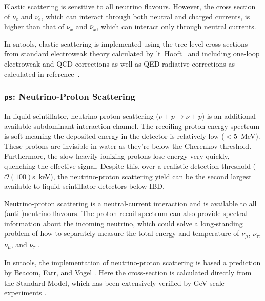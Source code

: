 \documentclass[11pt, oneside]{article}
\newcommand{\nue}{\ensuremath{\nu_e}\xspace}
\newcommand{\nux}{\ensuremath{\nu_x}\xspace}
\newcommand{\nuebar}{\ensuremath{\bar{\nu}_e}\xspace}
\newcommand{\nuxbar}{\ensuremath{\bar{\nu}_x}\xspace}
\begin{document}
Elastic scattering is sensitive to all neutrino flavours.
However, the cross section of \nue and \nuebar, which can interact through both neutral and charged currents, is higher than that of \nux and \nuxbar, which can interact only through neutral currents.

In sntools, elastic scattering is implemented using the tree-level cross sections from standard electroweak theory calculated by ’t~Hooft~\cite{t-Hooft1971} and including one-loop electroweak and QCD corrections as well as QED radiative corrections as calculated in reference~\cite{Bahcall1995}.

\subsubsection{\texttt{ps}: Neutrino-Proton Scattering}
In liquid scintillator, neutrino-proton scattering ($\nu + p \rightarrow \nu + p$) is an additional available subdominant interaction channel. The recoiling proton energy spectrum is soft meaning the deposited energy in the detector is relatively low ($<5$~MeV). These protons are invisible in water as they're below the Cherenkov threshold. Furthermore, the slow heavily ionizing protons lose energy very quickly, quenching the effective signal. Despite this, over a realistic detection threshold ($\mathcal{O}(100)$s~keV), the neutrino-proton scattering yield can be the second largest available to liquid scintillator detectors below IBD. 

Neutrino-proton scattering is a neutral-current interaction and is available to all (anti-)neutrino flavours. The proton recoil spectrum can also provide spectral information about the incoming neutrino, which could solve a long-standing problem of how to separately measure the total energy and temperature of $\nu_{\mu}$, $\nu_{\tau}$, $\bar{\nu}_{\mu}$, and $\bar{\nu}_{\tau}$ \cite{beacom2002detection}.

In sntools, the implementation of neutrino-proton scattering is based a prediction by Beacom, Farr, and Vogel \cite{beacom2002detection}. Here the cross-section is calculated directly from the Standard Model, which has been extensively verified by GeV-scale experiments \cite{ahrens1987measurement}. 
\end{document}
